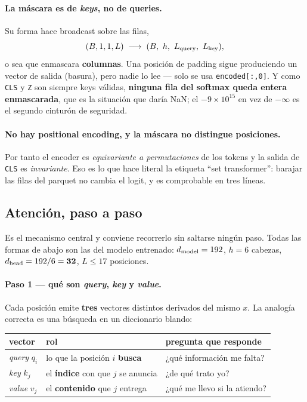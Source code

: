 \documentclass[11pt,a4paper]{article}
\newcommand{\code}[1]{\texttt{\small #1}}
\begin{document}
\paragraph{La máscara es de \emph{keys}, no de queries.} Su forma hace broadcast sobre las filas,
\[
(B,1,1,L) \;\longrightarrow\; (B,\ h,\ L_{\rm query},\ L_{\rm key}),
\]
o sea que enmascara \textbf{columnas}. Una posición de padding sigue
produciendo un vector de salida (basura), pero nadie lo lee --- solo se usa \code{encoded[:,0]}. Y
como \code{CLS} y \code{Z} son siempre keys válidas, \textbf{ninguna fila del softmax queda entera
enmascarada}, que es la situación que daría NaN; el $-9\times10^{15}$ en vez de $-\infty$ es el
segundo cinturón de seguridad.

\paragraph{No hay positional encoding, y la máscara no distingue posiciones.} Por tanto el encoder es
\emph{equivariante a permutaciones} de los tokens y la salida de \code{CLS} es \emph{invariante}. Eso
es lo que hace literal la etiqueta ``set transformer'': barajar las filas del parquet no cambia el
logit, y es comprobable en tres líneas.

\subsection{Atención, paso a paso}
\label{sec:atencion}

Es el mecanismo central y conviene recorrerlo sin saltarse ningún paso. Todas las formas de abajo
son las del modelo entrenado: $d_{\rm model}=192$, $h=6$ cabezas,
$d_{\rm head} = 192/6 = \mathbf{32}$, $L\le17$ posiciones.

\paragraph{Paso 1 --- qué son \emph{query}, \emph{key} y \emph{value}.} Cada posición emite
\textbf{tres} vectores distintos derivados del mismo $x$. La analogía correcta es una búsqueda en un
diccionario blando:

\begin{center}
\begin{tabularx}{\linewidth}{llX}
\toprule
vector & rol & pregunta que responde \\
\midrule
\emph{query} $q_i$ & lo que la posición $i$ \textbf{busca} & ¿qué información me falta? \\
\emph{key} $k_j$ & el \textbf{índice} con que $j$ se anuncia & ¿de qué trato yo? \\
\emph{value} $v_j$ & el \textbf{contenido} que $j$ entrega & ¿qué me llevo si la atiendo? \\
\bottomrule
\end{tabularx}
\end{center}
\end{document}
